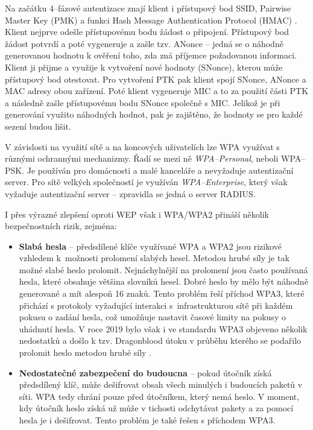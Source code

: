 Na začátku 4--fázové autentizace znají klient i přístupový bod SSID, Pairwise Master Key (PMK) a funkci Hash Message Authentication Protocol (HMAC) \cite{kohlios2018comprehensive}. Klient nejprve odešle přístupovému bodu žádost o připojení. Přístupový bod žádost potvrdí a poté vygeneruje a zašle tzv. ANonce -- jedná se o náhodně generovanou hodnotu k ověření toho, zda zná příjemce požadovanou informaci. Klient ji přijme a využije k vytvoření nové hodnoty (SNonce), kterou může přístupový bod otestovat. Pro vytvoření PTK pak klient spojí SNonce, ANonce a MAC adresy obou zařízení. Poté klient vygeneruje MIC a to za použití části PTK a následně zašle přístupovému bodu SNonce společně s MIC. Jelikož je při generování využito náhodných hodnot, pak je zajištěno, že hodnoty se pro každé sezení budou lišit.

V závislosti na využití sítě a na koncových uživatelích lze WPA využívat s různými ochrannými mechanizmy. Řadí se mezi ně \textit{WPA--Personal}, neboli WPA--PSK. Je používán pro domácnosti a malé kanceláře a nevyžaduje autentizační server. Pro sítě velkých společností je využíván \textit{WPA--Enterprise}, který však vyžaduje autentizační server -- zpravidla se jedná o server RADIUS.

I přes výrazné zlepšení oproti WEP však i WPA/WPA2 přináší několik bezpečnostních rizik, zejména:
\begin{itemize}
  \item{\textbf{Slabá hesla} -- předsdílené klíče využívané WPA a WPA2 jsou rizikové vzhledem k~možnosti prolomení slabých hesel. Metodou hrubé síly je tak možné slabé heslo prolomit. Nejnáchylnější na prolomení jsou často používaná hesla, které obsahuje většina slovníků hesel. Dobré heslo by mělo být náhodně generované a mít alespoň 16 znaků. Tento problém řeší příchod WPA3, které přichází s protokoly vyžadující interakci s~infrastrukturou sítě při každém pokusu o zadání hesla, což umožňuje nastavit časové limity na pokusy o uhádnutí hesla. V roce 2019 bylo však i ve standardu WPA3 objeveno několik nedostatků a došlo k tzv. Dragonblood útoku v průběhu kterého se podařilo prolomit heslo metodou hrubé síly \cite{vanhoef2020dragonblood}.}
  \item{\textbf{Nedostatečné zabezpečení do budoucna} -- pokud útočník získá předsdílený klíč, může dešifrovat obsah všech minulých i budoucích paketů v síti. WPA tedy chrání pouze před útočníkem, který nemá heslo. V moment, kdy útočník heslo získá už může v tichosti odchytávat pakety a za pomocí hesla je i dešifrovat. Tento problém je také řešen s příchodem WPA3.}
\end{itemize}

